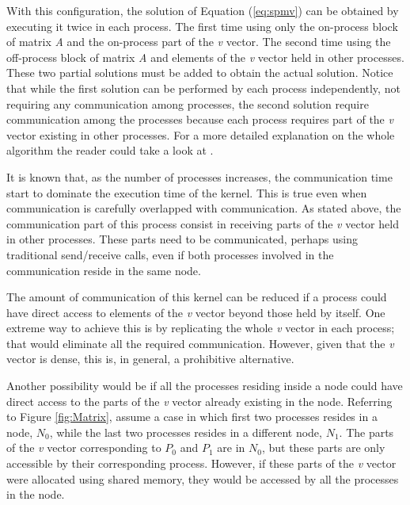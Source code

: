 With this configuration, the solution of Equation (\ref{eq:spmv}) can be obtained by executing it twice in each process. The first time using only the on-process block of matrix \emph{A} and the on-process part of the \emph{v} vector. The second time using the off-process block of matrix \emph{A} and elements of the \emph{v} vector held in other processes. These two partial solutions must be added to obtain the actual solution. Notice that while the first solution can be performed by each process independently, not requiring any communication among processes, the second solution require communication among the processes because each process requires part of the \emph{v} vector existing in other processes. For a more detailed explanation on the whole algorithm the reader could take a look at \cite{BienzGO16}.

\medskip

It is known that, as the number of processes increases, the communication time start to dominate the execution time of the kernel. This is true even when communication is carefully overlapped with communication. As stated above, the communication part of this process consist in receiving parts of the \emph{v} vector held in other processes. These parts need to be communicated, perhaps using traditional send/receive calls, even if both processes involved in the communication reside in the same node.

\medskip

The amount of communication of this kernel can be reduced if a process could have direct access to elements of the \emph{v} vector beyond those held by itself. One extreme way to achieve this is by replicating the whole \emph{v} vector in each process; that would eliminate all the required communication. However, given that the \emph{v} vector is dense, this is, in general, a prohibitive alternative. 

\medskip

Another possibility would be if all the processes residing inside a node could have direct access to the parts of the \emph{v} vector already existing in the node. Referring to Figure \ref{fig:Matrix}, assume a case in which first two processes resides in a node, $N_0$, while the last two processes resides in a different node, $N_1$. The parts of the \emph{v} vector corresponding to $P_0$ and $P_1$ are in $N_0$, but these parts are only accessible by their corresponding process. However, if these parts of the \emph{v} vector were allocated using shared memory, they would be accessed by all the processes in the node. 

